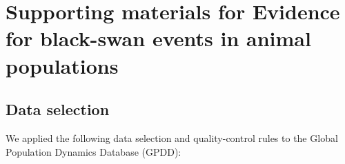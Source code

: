 \chapter[Supporting materials]{Supporting materials for Evidence for black-swan
events in animal populations}

\begin{centering}
\LARGE
\end{centering}

\section{Data selection}

We applied the following data selection and quality-control rules to the
Global Population Dynamics Database (GPDD):

